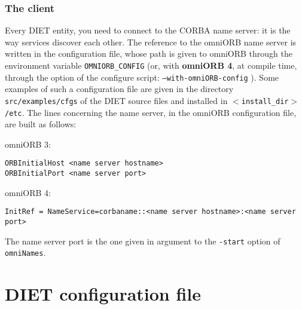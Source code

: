 \subsubsection{The client}

Every DIET entity, you need to connect to the CORBA name server: it is
the way services discover each other. The reference to the omniORB
name server is written in the configuration file, whose path is given
to omniORB through the environment variable \texttt{OMNIORB\_CONFIG}
(or, with \textbf{omniORB 4}, at compile time, through the option of
the configure script: \texttt{--with-omniORB-config} ). Some examples
of such a configuration file are given in the directory
\texttt{src/examples/cfgs} of the DIET source files and installed in
\texttt{$<$install\_dir$>$/etc}. The lines concerning the name server,
in the omniORB configuration file, are built as follows:
\begin{description}
 \item{omniORB 3:}
{\footnotesize
\begin{verbatim}
ORBInitialHost <name server hostname>
ORBInitialPort <name server port>
\end{verbatim}
}
 \item{omniORB 4:}
{\footnotesize
\begin{verbatim}
InitRef = NameService=corbaname::<name server hostname>:<name server port>
\end{verbatim}
}
The name server port is the one given in argument to the \texttt{-start} option
of \texttt{omniNames}.
\end{description}



\section{DIET configuration file} 

